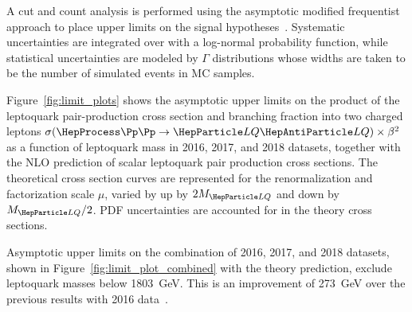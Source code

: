 A cut and count analysis is performed using the asymptotic \CLs modified frequentist approach to place upper limits on the signal hypotheses~\cite{Junk:1999kv,Read:411537:Lyons}. Systematic uncertainties are integrated over with a log-normal probability function, while statistical uncertainties are modeled by $\Gamma$ distributions whose widths are taken to be the number of simulated events in MC samples.

Figure~\ref{fig:limit_plots} shows the asymptotic upper limits on the product of the leptoquark pair-production cross section and branching fraction into two charged leptons $\xsec(\ppToLQLQ)\times\bfuu$ as a function of leptoquark mass in 2016, 2017, and 2018 datasets, together with the NLO prediction of scalar leptoquark pair production cross sections. The theoretical cross section curves are represented for the renormalization and factorization scale $\mu$, varied by up by $2\MLQ$ and down by $\MLQ/2$. PDF uncertainties are accounted for in the theory cross sections. 

Asymptotic upper limits on the combination of 2016, 2017, and 2018 datasets, shown in Figure~\ref{fig:limit_plot_combined} with the theory prediction, exclude leptoquark masses below \SI{1803}{\GeV}. This is an improvement of \SI{273}{\GeV} over the previous results with 2016 data~\cite{CMSLQ2_2016}.

